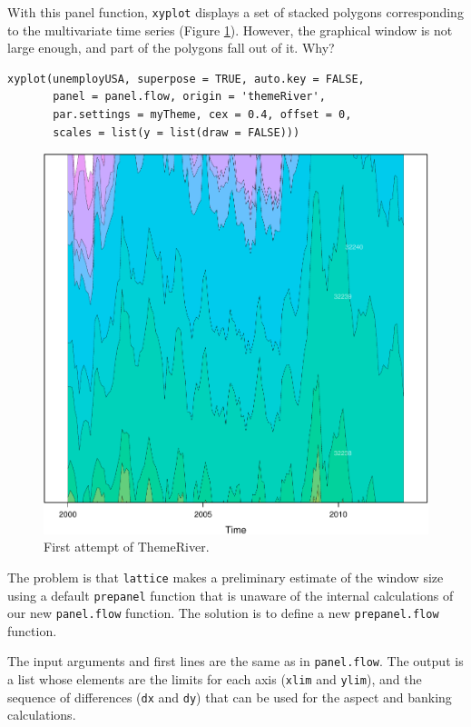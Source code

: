 \documentclass[smallroyalvopaper]{memoir}
\begin{document}
With this panel function, \texttt{xyplot} displays a set of stacked
polygons corresponding to the multivariate time series (Figure
\ref{fig:themeRiverError}). However, the graphical window is not
large enough, and part of the polygons fall out of it. Why?

\lstset{language=r,label= ,caption= ,captionpos=b,numbers=none}
\begin{lstlisting}
xyplot(unemployUSA, superpose = TRUE, auto.key = FALSE,
       panel = panel.flow, origin = 'themeRiver',
       par.settings = myTheme, cex = 0.4, offset = 0,
       scales = list(y = list(draw = FALSE)))
\end{lstlisting}

\begin{figure}[htbp]
\centering
\includegraphics[height=0.45\textheight]{figs/ThemeRiverError.pdf}
\caption{First attempt of ThemeRiver. \label{fig:themeRiverError}}
\end{figure}

The problem is that \texttt{lattice} makes a preliminary estimate of the
window size using a default \texttt{prepanel} function that is unaware of the
internal calculations of our new \texttt{panel.flow} function. The solution
is to define a new \texttt{prepanel.flow} function. 

The input arguments and first lines are the same as in
\texttt{panel.flow}. The output is a list whose elements are the limits for
each axis (\texttt{xlim} and \texttt{ylim}), and the sequence of differences (\texttt{dx}
and \texttt{dy}) that can be used for the aspect and banking
calculations. 
\end{document}
